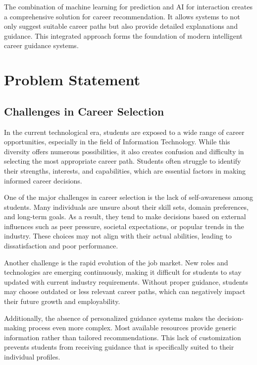 \documentclass[12pt,a4paper]{report}
\begin{document}
{The combination of machine learning for prediction and AI for interaction creates a comprehensive solution for career recommendation. It allows systems to not only suggest suitable career paths but also provide detailed explanations and guidance. This integrated approach forms the foundation of modern intelligent career guidance systems.


\clearpage
\setcounter{page}{10}

\chapter{Problem Statement}
\setlength{\parindent}{0pt}
\setlength{\parskip}{0.6em}
\justifying

\section{Challenges in Career Selection}

In the current technological era, students are exposed to a wide range of career opportunities, especially in the field of Information Technology. While this diversity offers numerous possibilities, it also creates confusion and difficulty in selecting the most appropriate career path. Students often struggle to identify their strengths, interests, and capabilities, which are essential factors in making informed career decisions.

One of the major challenges in career selection is the lack of self-awareness among students. Many individuals are unsure about their skill sets, domain preferences, and long-term goals. As a result, they tend to make decisions based on external influences such as peer pressure, societal expectations, or popular trends in the industry. These choices may not align with their actual abilities, leading to dissatisfaction and poor performance.

Another challenge is the rapid evolution of the job market. New roles and technologies are emerging continuously, making it difficult for students to stay updated with current industry requirements. Without proper guidance, students may choose outdated or less relevant career paths, which can negatively impact their future growth and employability.

Additionally, the absence of personalized guidance systems makes the decision-making process even more complex. Most available resources provide generic information rather than tailored recommendations. This lack of customization prevents students from receiving guidance that is specifically suited to their individual profiles.

}
\end{document}
